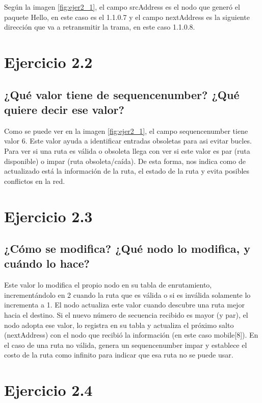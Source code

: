 Según la imagen \ref{fig:ejer2_1}, el campo srcAddress es el nodo que generó el paquete Hello, en este caso es el 1.1.0.7 y el campo nextAddress es la siguiente dirección que va a retransmitir la trama, en este caso 1.1.0.8. 



\section{Ejercicio 2.2}

\subsection{¿Qué valor tiene de sequencenumber? ¿Qué quiere decir ese valor?}

Como se puede ver en la imagen \ref{fig:ejer2_1}, el campo sequencenumber tiene valor 6. Este valor ayuda a identificar entradas obsoletas para asi evitar bucles. Para ver si una ruta es válida o obsoleta llega con ver si este valor es par (ruta disponible) o impar (ruta obsoleta/caída). De esta forma, nos indica como de actualizado está la información de la ruta, el estado de la ruta y evita posibles conflictos en la red.

\section{Ejercicio 2.3}

\subsection{¿Cómo se modifica? ¿Qué nodo lo modifica, y cuándo lo hace?}

Este valor lo modifica el propio nodo en su tabla de enrutamiento, incrementándolo en 2 cuando la ruta que es válida o si es inválida solamente lo incrementa a 1. 
El nodo actualiza este valor cuando descubre una ruta mejor hacia el destino. Si el nuevo número de secuencia recibido es mayor (y par), el nodo adopta ese valor, lo registra en su tabla y actualiza el próximo salto (nextAddress) con el nodo que recibió la información (en este caso mobile[8]). En el caso de una ruta no válida, genera un sequencenumber impar y establece el costo de la ruta como infinito para indicar que esa ruta no se puede usar.  

\section{Ejercicio 2.4}

